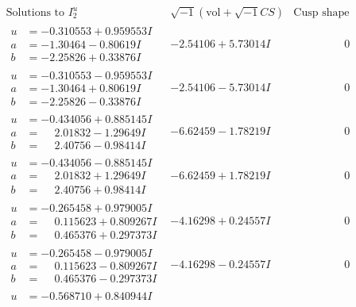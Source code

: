 \documentclass[1p]{elsarticle_modified}
\theoremstyle{definition}
\newcommand{\I}{\sqrt{-1}}
\begin{document}
$$\begin{array}{c|c|c}  
\text{Solutions to }I^u_{2}& \I (\text{vol} + \sqrt{-1}CS) & \text{Cusp shape}\\
 \hline 
\begin{aligned}
u &= -0.310553 + 0.959553 I \\
a &= -1.30464 - 0.80619 I \\
b &= -2.25826 + 0.33876 I\end{aligned}
 & -2.54106 + 5.73014 I & \phantom{-0.000000 } 0 \\ \hline\begin{aligned}
u &= -0.310553 - 0.959553 I \\
a &= -1.30464 + 0.80619 I \\
b &= -2.25826 - 0.33876 I\end{aligned}
 & -2.54106 - 5.73014 I & \phantom{-0.000000 } 0 \\ \hline\begin{aligned}
u &= -0.434056 + 0.885145 I \\
a &= \phantom{-}2.01832 - 1.29649 I \\
b &= \phantom{-}2.40756 - 0.98414 I\end{aligned}
 & -6.62459 - 1.78219 I & \phantom{-0.000000 } 0 \\ \hline\begin{aligned}
u &= -0.434056 - 0.885145 I \\
a &= \phantom{-}2.01832 + 1.29649 I \\
b &= \phantom{-}2.40756 + 0.98414 I\end{aligned}
 & -6.62459 + 1.78219 I & \phantom{-0.000000 } 0 \\ \hline\begin{aligned}
u &= -0.265458 + 0.979005 I \\
a &= \phantom{-}0.115623 + 0.809267 I \\
b &= \phantom{-}0.465376 + 0.297373 I\end{aligned}
 & -4.16298 + 0.24557 I & \phantom{-0.000000 } 0 \\ \hline\begin{aligned}
u &= -0.265458 - 0.979005 I \\
a &= \phantom{-}0.115623 - 0.809267 I \\
b &= \phantom{-}0.465376 - 0.297373 I\end{aligned}
 & -4.16298 - 0.24557 I & \phantom{-0.000000 } 0 \\ \hline\begin{aligned}
u &= -0.568710 + 0.840944 I \\

\end{aligned}
\end{array}$$
\end{document}
